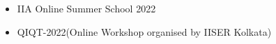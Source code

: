 
\begin{itemize}
   \item IIA Online Summer School 2022
   \item QIQT-2022(Online Workshop organised by IISER Kolkata)
\end{itemize}